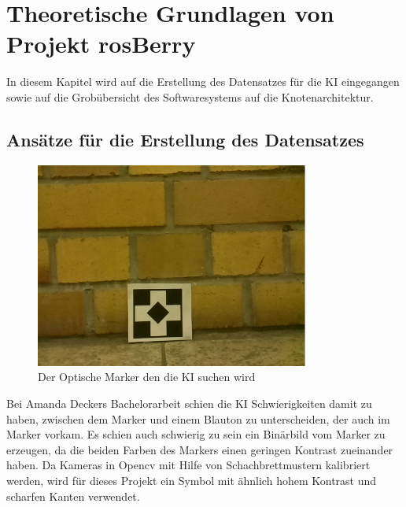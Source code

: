 \documentclass[conference]{IEEEtran}
\begin{document}
\section{Theoretische Grundlagen von Projekt rosBerry}
In diesem Kapitel wird auf die Erstellung des Datensatzes für die KI eingegangen sowie auf die Grobübersicht des Softwaresystems auf die Knotenarchitektur. %

\subsection{Ansätze für die Erstellung des Datensatzes}	%
\begin{figure} %
	\centering
	\includegraphics[width=9cm]{img/data1455211246.png}
	\caption{Der Optische Marker den die KI suchen wird }
	\label{Marker}
\end{figure}

Bei Amanda Deckers Bachelorarbeit schien die KI Schwierigkeiten damit zu haben, zwischen dem Marker und einem Blauton zu unterscheiden, der auch im Marker vorkam.
Es schien auch schwierig zu sein ein Binärbild vom Marker zu erzeugen, da die beiden Farben des Markers einen geringen Kontrast zueinander haben.
Da Kameras in Opencv mit Hilfe von Schachbrettmustern kalibriert werden, wird für dieses Projekt ein Symbol mit ähnlich hohem Kontrast und scharfen Kanten verwendet.
\\
\end{document}
